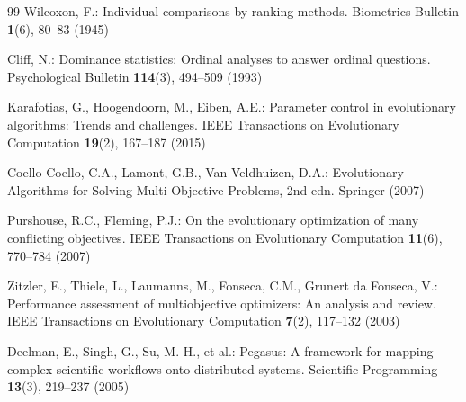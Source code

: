 \documentclass[runningheads]{llncs}
\begin{document}
\begin{thebibliography}{99}
Wilcoxon, F.: Individual comparisons by ranking methods. Biometrics Bulletin \textbf{1}(6), 80--83 (1945)

Cliff, N.: Dominance statistics: Ordinal analyses to answer ordinal questions. Psychological Bulletin \textbf{114}(3), 494--509 (1993)

Karafotias, G., Hoogendoorn, M., Eiben, A.E.: Parameter control in evolutionary algorithms: Trends and challenges. IEEE Transactions on Evolutionary Computation \textbf{19}(2), 167--187 (2015)

Coello Coello, C.A., Lamont, G.B., Van Veldhuizen, D.A.: Evolutionary Algorithms for Solving Multi-Objective Problems, 2nd edn. Springer (2007)

Purshouse, R.C., Fleming, P.J.: On the evolutionary optimization of many conflicting objectives. IEEE Transactions on Evolutionary Computation \textbf{11}(6), 770--784 (2007)

Zitzler, E., Thiele, L., Laumanns, M., Fonseca, C.M., Grunert da Fonseca, V.: Performance assessment of multiobjective optimizers: An analysis and review. IEEE Transactions on Evolutionary Computation \textbf{7}(2), 117--132 (2003)

Deelman, E., Singh, G., Su, M.-H., et al.: Pegasus: A framework for mapping complex scientific workflows onto distributed systems. Scientific Programming \textbf{13}(3), 219--237 (2005)


\end{thebibliography}
\end{document}
